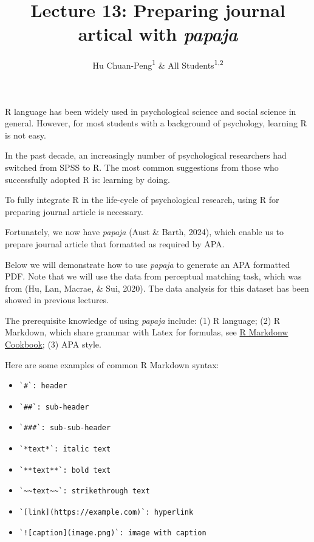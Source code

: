 \documentclass[
  man]{apa6}
\title{Lecture 13: Preparing journal artical with \emph{papaja}}
\author{Hu Chuan-Peng\textsuperscript{1} \& All Students\textsuperscript{1,2}}
\date{}
\affiliation{\vspace{0.5cm}\textsuperscript{1} Nanjing Normal Unviersity\\\textsuperscript{2} Collaborators' Affiliations}
\begin{document}
\maketitle

R language has been widely used in psychological science and social science in general. However, for most students with a background of psychology, learning R is not easy.

In the past decade, an increasingly number of psychological researchers had switched from SPSS to R. The most common suggestions from those who successfully adopted R is: learning by doing.

To fully integrate R in the life-cycle of psychological research, using R for preparing journal article is necessary.

Fortunately, we now have \emph{papaja} (Aust \& Barth, 2024), which enable us to prepare journal article that formatted as required by APA.

Below we will demonstrate how to use \emph{papaja} to generate an APA formatted PDF. Note that we will use the data from perceptual matching task, which was from (Hu, Lan, Macrae, \& Sui, 2020). The data analysis for this dataset has been showed in previous lectures.

The prerequisite knowledge of using \emph{papaja} include: (1) R language; (2) R Markdown, which share grammar with Latex for formulas, see \href{https://bookdown.org/yihui/rmarkdown-cookbook/}{R Markdonw Cookbook}; (3) APA style.

Here are some examples of common R Markdown syntax:

\begin{itemize}
\item
\begin{verbatim}
`#`: header
\end{verbatim}
\item
\begin{verbatim}
`##`: sub-header
\end{verbatim}
\item
\begin{verbatim}
`###`: sub-sub-header
\end{verbatim}
\item
\begin{verbatim}
`*text*`: italic text
\end{verbatim}
\item
\begin{verbatim}
`**text**`: bold text
\end{verbatim}
\item
\begin{verbatim}
`~~text~~`: strikethrough text
\end{verbatim}
\item
\begin{verbatim}
`[link](https://example.com)`: hyperlink
\end{verbatim}
\item
\begin{verbatim}
`![caption](image.png)`: image with caption
\end{verbatim}
\end{itemize}
\end{document}
